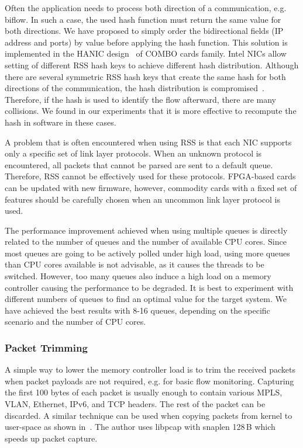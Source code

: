 Often the application needs to process both direction of a communication, e.g. biflow. In such a case, the used hash function must return the same value for both directions. We have proposed to simply order the bidirectional fields (IP address and ports) by value before applying the hash function. This solution is implemented in the HANIC design~\cite{Liberouter--Hanic} of COMBO cards family. Intel NICs allow setting of different RSS hash keys to achieve different hash distribution. Although there are several symmetric RSS hash keys that create the same hash for both directions of the communication, the hash distribution is compromised~\cite{Woo-2012-Scalable}. Therefore, if the hash is used to identify the flow afterward, there are many collisions. We found in our experiments that it is more effective to recompute the hash in software in these cases.

A problem that is often encountered when using RSS is that each NIC supports only a specific set of link layer protocols. When an unknown protocol is encountered, all packets that cannot be parsed are sent to a default queue. Therefore, RSS cannot be effectively used for these protocols. FPGA-based cards can be updated with new firmware, however, commodity cards with a fixed set of features should be carefully chosen when an uncommon link layer protocol is used.

The performance improvement achieved when using multiple queues is directly related to the number of queues and the number of available CPU cores. Since most queues are going to be actively polled under high load, using more queues than CPU cores available is not advisable, as it causes the threads to be switched. However, too many queues also induce a high load on a memory controller causing the performance to be degraded. It is best to experiment with different numbers of queues to find an optimal value for the target system. We have achieved the best results with 8-16 queues, depending on the specific scenario and the number of CPU cores.

\subsubsection{Packet Trimming}

A simple way to lower the memory controller load is to trim the received packets when packet payloads are not required, e.g. for basic flow monitoring. Capturing the first 100 bytes of each packet is usually enough to contain various MPLS, VLAN, Ethernet, IPv6, and TCP headers. The rest of the packet can be discarded. A similar technique can be used when copying packets from kernel to user-space as shown in~\cite{Deri-2004-Improving}. The author uses libpcap with snaplen 128\,B which speeds up packet capture.

